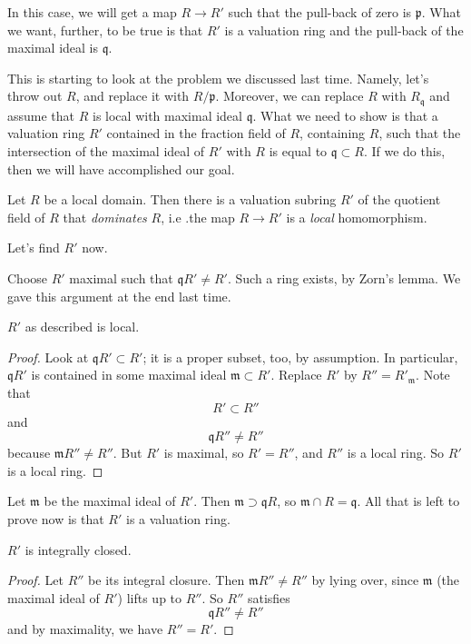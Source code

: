 In this case, we will get  a map $R \to R'$ such that the pull-back of zero is
$\mathfrak{p}$.  What we want, further, to be true is that $R'$ is a valuation
ring and the pull-back of the maximal ideal is $\mathfrak{q}$. 



This is starting to look at the problem we discussed last time.
Namely, let's throw out $R$, and replace it with  $R/\mathfrak{p}$.  
Moreover, we can replace $R$ with $R_{\mathfrak{q}}$ and assume that $R$ is
local with maximal ideal $\mathfrak{q}$.
What we need to show is that a valuation ring $R' $ contained in the fraction
field of $R$, containing $R$, such that the intersection of the maximal ideal of
$R'$ with $R$ is equal to $\mathfrak{q} \subset R$.
If we do this, then we will have accomplished our goal.  

\begin{lemma}
Let $R$ be a local domain. Then there is a valuation subring $R'$ of the quotient
field of $R$ that \emph{dominates} $R$, i.e .the map $R \to R'$ is a
\emph{local} homomorphism.
\end{lemma}

Let's find $R'$ now.

Choose $R'$ maximal such that $\mathfrak{q} R' \neq R'$. Such a ring exists, by
Zorn's lemma. We gave this argument at the end last time.

\begin{lemma} 
$R'$ as described is local.
\end{lemma} 
\begin{proof} 
Look at $\mathfrak{q}R' \subset R'$; it is a proper subset, too, by assumption.
In particular, $\mathfrak{q}R'$ is contained in some maximal ideal
$\mathfrak{m}\subset R'$.   Replace $R'$ by $R'' = R'_{\mathfrak{m}}$.  Note that
\[ R' \subset R''  \]
and
\[ \mathfrak{q}R'' \neq R''  \]
because $\mathfrak{m}R'' \neq R''$.  But $R'$ is maximal, so $R' = R''$, and
$R''$ is a local ring. So $R'$ is a local ring. 
\end{proof} 

Let $\mathfrak{m}$ be the maximal ideal of $R'$. Then $\mathfrak{m} \supset
\mathfrak{q}R$, so $\mathfrak{m} \cap R = \mathfrak{q}$. 
All that is left to prove now is that $R'$ is a valuation ring.  

\begin{lemma} 
$R'$ is integrally closed.
\end{lemma} 

\begin{proof} 
Let $R''$ be its integral closure. Then $\mathfrak{m} R'' \neq R''$ by lying
over, since $\mathfrak{m}$ (the maximal ideal of $R'$) lifts up to $R''$. So
$R''$ satisfies
\[ \mathfrak{q}R'' \neq R''  \]
and by maximality, we have $R'' = R'$. 
\end{proof} 

